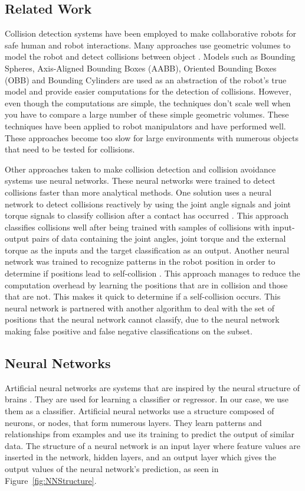 \documentclass[conference]{IEEEtran}
\begin{document}
\subsection{Related Work}

Collision detection systems have been employed to make collaborative robots for safe human and robot interactions. Many approaches use geometric volumes to model the robot and detect collisions between object \cite{b2}. Models such as Bounding Spheres, Axis-Aligned Bounding Boxes (AABB), Oriented Bounding Boxes (OBB) and Bounding Cylinders are used as an abstraction of the robot's true model and provide easier computations for the detection of collisions. However, even though the computations are simple, the techniques don't scale well when you have to compare a large number of these simple geometric volumes. These techniques have been applied to robot manipulators and have performed well. These approaches become too slow for large environments with numerous objects that need to be tested for collisions.

Other approaches taken to make collision detection and collision avoidance systems use neural networks. These neural networks were trained to detect collisions faster than more analytical methods. One solution uses a neural network to detect collisions reactively by using the joint angle signals and joint torque signals to classify collision after a contact has occurred \cite{b3}. This approach classifies collisions well after being trained with samples of collisions with input-output pairs of data containing the joint angles, joint torque and the external torque as the inputs and the target classification as an output. Another neural network was trained to recognize patterns in the robot position in order to determine if positions lead to self-collision \cite{b4}. This approach manages to reduce the computation overhead by learning the positions that are in collision and those that are not. This makes it quick to determine if a self-collision occurs. This neural network is partnered with another algorithm to deal with the set of positions that the neural network cannot classify, due to the neural network making false positive and false negative classifications on the subset.

\subsection{Neural Networks}
Artificial neural networks are systems that are inspired by the neural structure of brains \cite{b1}. They are used for learning a classifier or regressor. In our case, we use them as a classifier. Artificial neural networks use a structure  composed of neurons, or nodes, that form numerous layers. They learn patterns and relationships from examples and use its training to predict the output of similar data. The structure of a neural network is an input layer where feature values are inserted in the network, hidden layers, and an output layer which gives the output values of the neural network's prediction, as seen in Figure~\ref{fig:NNStructure}. 
    
\end{document}

